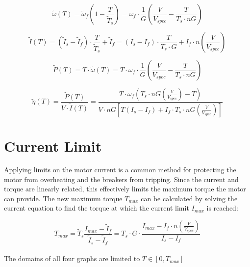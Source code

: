\documentclass[a4paper]{article}
\begin{document}
	\begin{equation}
		\widetilde{\omega} (T) = \widetilde{\omega}_f \left( 1 - \frac{T}{\widetilde{T}_s} \right)
		= \omega_f \cdot \frac{1}{G} \left( \frac{V}{V_{spec}} - \frac{T}{T_s \cdot n G} \right)
	\end{equation}
	
	\begin{equation}
		\widetilde{I} (T) = \left( \widetilde{I}_s - \widetilde{I}_f \right) \cdot \frac{T}{\widetilde{T}_s} + \widetilde{I}_f
		= \left( I_s - I_f \right) \cdot \frac{T}{T_s \cdot G} + I_f \cdot n \left( \frac{V}{V_{spec}} \right)
	\end{equation}
	
	\begin{equation}
		\widetilde{P} (T) = T \cdot \widetilde{\omega} (T)
		= T \cdot \omega_f \cdot \frac{1}{G} \left( \frac{V}{V_{spec}} - \frac{T}{T_s \cdot n G} \right)
	\end{equation}
	
	\begin{equation}
		\widetilde{\eta} (T) = \frac{\widetilde{P}(T)}{V \cdot \widetilde{I} (T)}
		= \frac{T \cdot \omega_f \left( T_s \cdot n G \left( \frac{V}{V_{spec}} \right) - T \right)}{V \cdot n G \left[ T \left( I_s - I_f \right) + I_f \cdot T_s \cdot n G \left( \frac{V}{V_{spec}} \right) \right]}
	\end{equation}


	\section*{Current Limit}
	
	Applying limits on the motor current is a common method for protecting the motor from overheating and the breakers from tripping. Since the current and torque are linearly related, this effectively limits the maximum torque the motor can provide. The new maximum torque $ T_{max} $ can be calculated by solving the current equation to find the torque at which the current limit $ I_{max} $ is reached:
	
	\begin{equation}
		T_{max} = \widetilde{T}_s \frac{I_{max} - \widetilde{I}_f}{\widetilde{I}_s - \widetilde{I}_f}
		= T_s \cdot G \cdot \frac{I_{max} - I_f \cdot n \left( \frac{V}{V_{spec}} \right)}{I_s - I_f}
	\end{equation}\\
	
	The domains of all four graphs are limited to $ T \in [0, T_{max}] $
	
	
	
\end{document}
